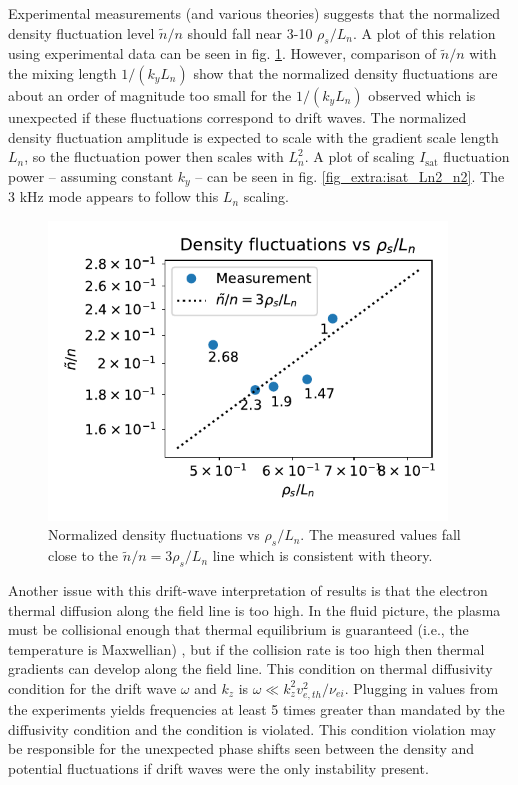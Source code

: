 Experimental measurements (and various theories) \cite{Liewer_measurements_1985} suggests that the normalized density fluctuation level $\widetilde n / n$ should fall near 3-10 $\rho_s / L_n$. A plot of this relation using experimental data can be seen in fig. \ref{fig_extra:density-fluct_vs_rhos-Ln}. However, comparison of $\widetilde n / n$ with the mixing length $1/(k_y L_n)$ \cite{Liewer_measurements_1985} show that the normalized density fluctuations are about an order of magnitude too small for the $1/(k_y L_n)$ observed which is unexpected if these fluctuations correspond to drift waves. The normalized density fluctuation amplitude is expected to scale with the gradient scale length $L_n$, so the fluctuation power then scales with $L_n^2$. A plot of scaling $I_\text{sat}$ fluctuation power -- assuming constant $k_y$ -- can be seen in fig. \ref{fig_extra:isat_Ln2_n2}. The 3 kHz mode appears to follow this $L_n$ scaling.

\begin{figure}
    \centering
    \includegraphics[width=300pt]{figures/extra/density-fluct_vs_rhos-Ln.pdf}
    \caption[Normalized density fluctuations vs $\rho_s / L_n$]{Normalized density fluctuations vs $\rho_s / L_n$. The measured values fall close to the $\tilde{n}/n = 3 \rho_s / L_n$ line which is consistent with theory.}
    \label{fig_extra:density-fluct_vs_rhos-Ln}
\end{figure}

Another issue with this drift-wave interpretation of results is that the electron thermal diffusion along the field line is too high. In the fluid picture, the plasma must be collisional enough that thermal equilibrium is guaranteed (i.e., the temperature is Maxwellian) , but if the collision rate is too high then thermal gradients can develop along the field line\cite{Goldston_textbook}. This condition on thermal diffusivity condition for the drift wave $\omega$ and $k_z$ is $\omega \ll k_z^2 v_{e, th}^2 / \nu_{ei}$. Plugging in values from the experiments yields frequencies at least 5 times greater than mandated by the diffusivity condition and the condition is violated. This condition violation may be responsible for the unexpected phase shifts seen between the density and potential fluctuations if drift waves were the only instability present.

